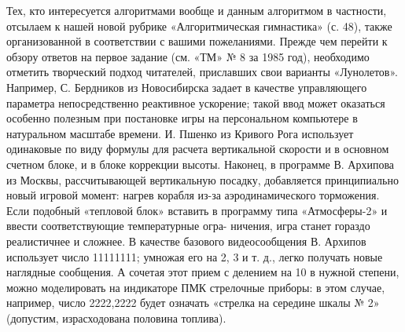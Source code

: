 \documentclass[11pt,a4paper,oneside]{article}
\begin{document}
Тех, кто интересуется алгоритмами вообще и данным алгоритмом в частности, отсылаем к нашей новой рубрике «Алгоритмическая гимнастика» (с. 48), также организованной в соответствии с вашими пожеланиями. Прежде чем перейти к обзору ответов на первое задание (см. «ТМ» № 8 за 1985 год), необходимо отметить творческий подход читателей, приславших свои варианты «Лунолетов». Например, С. Бердников из Новосибирска задает в качестве управляющего параметра непосредственно реактивное ускорение; такой ввод может оказаться особенно полезным при постановке игры на персональном компьютере в натуральном масштабе времени. И. Пшенко из Кривого Рога использует одинаковые по виду формулы для расчета вертикальной скорости и в основном счетном блоке, и в блоке коррекции высоты. Наконец, в программе В. Архипова из Москвы, рассчитывающей вертикальную посадку, добавляется принципиально новый игровой момент: нагрев корабля из-за аэродинамического торможения. Если подобный «тепловой блок» вставить в программу типа «Атмосферы-2» и ввести соответствующие температурные огра- ничения, игра станет гораздо реалистичнее и сложнее. В качестве базового видеосообщения В. Архипов использует число 11111111; умножая его на 2, 3 и т. д., легко получать новые наглядные сообщения. А сочетая этот прием с делением на 10 в нужной степени, можно моделировать на индикаторе ПМК стрелочные приборы: в этом случае, например, число 2222,2222 будет означать «стрелка на середине шкалы № 2» (допустим, израсходована половина топлива).
\end{document}
